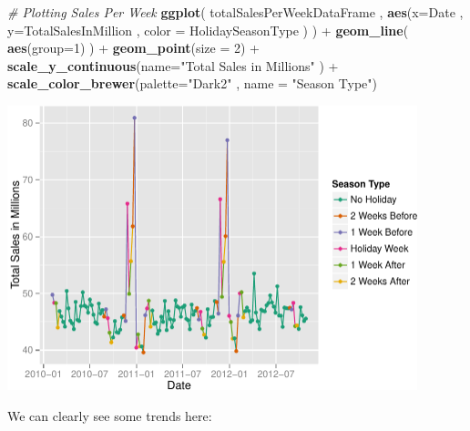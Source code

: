 \documentclass[]{article}
\newenvironment{Shaded}{\begin{snugshade}}{\end{snugshade}}
\newcommand{\KeywordTok}[1]{\textcolor[rgb]{0.13,0.29,0.53}{\textbf{{#1}}}}
\newcommand{\DataTypeTok}[1]{\textcolor[rgb]{0.13,0.29,0.53}{{#1}}}
\newcommand{\DecValTok}[1]{\textcolor[rgb]{0.00,0.00,0.81}{{#1}}}
\newcommand{\StringTok}[1]{\textcolor[rgb]{0.31,0.60,0.02}{{#1}}}
\newcommand{\CommentTok}[1]{\textcolor[rgb]{0.56,0.35,0.01}{\textit{{#1}}}}
\newcommand{\NormalTok}[1]{{#1}}
\begin{document}
\begin{Shaded}
\begin{Highlighting}[]
\CommentTok{# Plotting Sales Per Week}
\KeywordTok{ggplot}\NormalTok{( totalSalesPerWeekDataFrame , }
        \KeywordTok{aes}\NormalTok{(}\DataTypeTok{x=}\NormalTok{Date , }\DataTypeTok{y=}\NormalTok{TotalSalesInMillion , }\DataTypeTok{color =} \NormalTok{HolidaySeasonType ) ) +}\StringTok{ }
\StringTok{  }\KeywordTok{geom_line}\NormalTok{( }\KeywordTok{aes}\NormalTok{(}\DataTypeTok{group=}\DecValTok{1}\NormalTok{) ) +}\StringTok{ }
\StringTok{  }\KeywordTok{geom_point}\NormalTok{(}\DataTypeTok{size =} \DecValTok{2}\NormalTok{) +}
\StringTok{  }\KeywordTok{scale_y_continuous}\NormalTok{(}\DataTypeTok{name=}\StringTok{"Total Sales in Millions"} \NormalTok{) +}
\StringTok{  }\KeywordTok{scale_color_brewer}\NormalTok{(}\DataTypeTok{palette=}\StringTok{"Dark2"} \NormalTok{, }\DataTypeTok{name =} \StringTok{"Season Type"}\NormalTok{)}
\end{Highlighting}
\end{Shaded}

\includegraphics[width=450px]{PredictingWeeklySalesAtWalmart_files/figure-latex/plottingSalesPerWeek-1}

We can clearly see some trends here:
\end{document}
